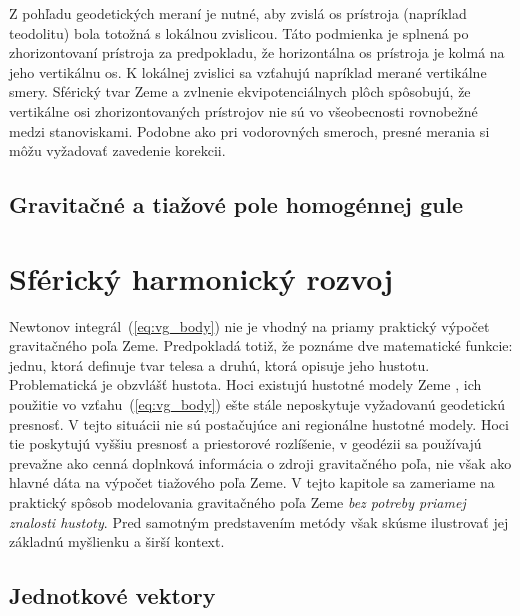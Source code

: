 \documentclass[a4paper, 12pt]{book}
\begin{document}
Z pohľadu geodetických meraní je nutné, aby zvislá os prístroja (napríklad 
teodolitu) bola totožná s lokálnou zvislicou.  Táto podmienka je splnená po 
zhorizontovaní prístroja za predpokladu, že horizontálna os prístroja je kolmá 
na jeho vertikálnu os.  K lokálnej zvislici sa vzťahujú napríklad merané 
vertikálne smery.  Sférický tvar Zeme a zvlnenie ekvipotenciálnych plôch 
spôsobujú, že vertikálne osi zhorizontovaných prístrojov nie sú vo všeobecnosti 
rovnobežné medzi stanoviskami.  Podobne ako pri vodorovných smeroch, presné 
merania si môžu vyžadovať zavedenie korekcii.






\section{Gravitačné a tiažové pole homogénnej gule}






\chapter{Sférický harmonický rozvoj}
\label{sec:spherical_harmonic_expansion}

Newtonov integrál~(\ref{eq:vg_body}) nie je vhodný na priamy praktický výpočet 
gravitačného poľa Zeme.  Predpokladá totiž, že poznáme dve matematické funkcie: 
jednu, ktorá definuje tvar telesa a druhú, ktorá opisuje jeho hustotu.  
Problematická je obzvlášť hustota.  Hoci existujú hustotné modely Zeme 
\citep[napríklad][]{Dziewonski1981}, ich použitie vo vzťahu~(\ref{eq:vg_body}) 
ešte stále neposkytuje vyžadovanú geodetickú presnosť.  V tejto situácii nie sú 
postačujúce ani regionálne hustotné modely.  Hoci tie poskytujú vyššiu presnosť 
a priestorové rozlíšenie, v geodézii sa používajú prevažne ako cenná doplnková 
informácia o zdroji gravitačného poľa, nie však ako hlavné dáta na výpočet 
tiažového poľa Zeme.  V tejto kapitole sa zameriame na praktický spôsob 
modelovania gravitačného poľa Zeme \emph{bez potreby priamej znalosti hustoty}.  
Pred samotným predstavením metódy však skúsme ilustrovať jej základnú myšlienku 
a širší kontext.






\section{Jednotkové vektory}
\label{sec:unit_vectors}
\end{document}

